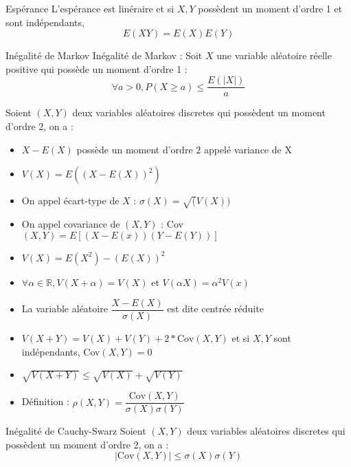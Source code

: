 \documentclass[french, a4paper, 10pt, twocolumn]{article}
\newcommand{\R}{\mathbb{R}}   %
\begin{document}
\begin{theoreme}{Espérance}
    L'espérance est linéraire et si \(X,Y\) possèdent un moment d'ordre 1 et sont indépendants,
    \[E(XY)=E(X)E(Y)\]
\end{theoreme}

\begin{theoreme}{Inégalité de Markov}
    Inégalité de Markov : Soit $X$ une variable aléatoire réelle positive qui possède un moment d'ordre 1 :
     \[\forall a>0, {P(X\geqslant a)\leqslant \frac{E(|X|)}{a}}\]
\end{theoreme}
 
\begin{definition}
    Soient \((X,Y)\) deux variables aléatoires discretes qui possèdent un moment d'ordre 2, on a :
    \begin{itemize}[label=\(\bullet\)]
        \item \(X-E(X)\) possède un moment d'ordre 2 appelé variance de X
        \item \(V(X)=E((X-E(X))^2)\)
        \item On appel écart-type de \(X\) : \(\sigma(X)=\sqrt(V(X))\)
        \item On appel covariance de \((X,Y)\) : Cov\((X,Y)=E[(X-E(x))(Y-E(Y))]\)
    \end{itemize}

    \tcblower
    \begin{itemize}
        \item \(V(X)=E(X^2)-(E(X))^2\)
        \item \(\forall \alpha \in \R, V(X+\alpha)=V(X)\) et \(V(\alpha X)=\alpha^2V(x)\)
        \item La variable aléatoire \(\dfrac{X-E(X)}{\sigma(X)}\) est dite centrée réduite
        \item \(V(X+Y)=V(X)+V(Y)+2*\text{Cov}(X,Y)\) et si \(X,Y\) sont indépendants, Cov\((X,Y)=0\)
        \item \(\sqrt{V(X+Y)}\leq\sqrt{V(X)}+\sqrt{V(Y)}\)
        \item Définition : \(\rho(X,Y)=\dfrac{\text{Cov}(X,Y)}{\sigma(X)\sigma(Y)}\)
    \end{itemize}
\end{definition}

\begin{theoreme}{Inégalité de Cauchy-Swarz}
    Soient \((X,Y)\) deux variables aléatoires discretes qui possèdent un moment d'ordre 2, on a :
        \[|\text{Cov}(X,Y)|\leq \sigma(X)\sigma(Y)\] 
\end{theoreme}
\end{document}
